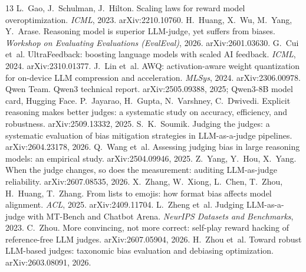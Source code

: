 \documentclass[10pt]{article}
\begin{document}
\begin{thebibliography}{13}\small
{} L.~Gao, J.~Schulman, J.~Hilton. Scaling laws for reward model
overoptimization. \emph{ICML}, 2023. arXiv:2210.10760.
 H.~Huang, X.~Wu, M.~Yang, Y.~Arase. Reasoning model is superior
LLM-judge, yet suffers from biases. \emph{Workshop on Evaluating Evaluations (EvalEval)}, 2026.
arXiv:2601.03630.
 G.~Cui et~al. UltraFeedback: boosting language models with
scaled AI feedback. \emph{ICML}, 2024. arXiv:2310.01377.
 J.~Lin et~al. AWQ: activation-aware weight quantization for on-device LLM
compression and acceleration. \emph{MLSys}, 2024. arXiv:2306.00978.
 Qwen Team. Qwen3 technical report. arXiv:2505.09388, 2025; Qwen3-8B
model card, Hugging Face.
 P.~Jayarao, H.~Gupta, N.~Varshney, C.~Dwivedi. Explicit
reasoning makes better judges: a systematic study on accuracy, efficiency, and robustness. arXiv:2509.13332, 2025.
 S.~K.~Soumik. Judging the judges: a systematic evaluation of bias
mitigation strategies in LLM-as-a-judge pipelines. arXiv:2604.23178, 2026.
 Q.~Wang et~al. Assessing judging bias in large reasoning models:
an empirical study. arXiv:2504.09946, 2025.
 Z.~Yang, Y.~Hou, X.~Yang. When the judge changes, so does the
measurement: auditing LLM-as-judge reliability. arXiv:2607.08535, 2026.
 X.~Zhang, W.~Xiong, L.~Chen, T.~Zhou, H.~Huang, T.~Zhang. From lists
to emojis: how format bias affects model alignment. \emph{ACL}, 2025. arXiv:2409.11704.
 L.~Zheng et~al. Judging LLM-as-a-judge with MT-Bench and Chatbot
Arena. \emph{NeurIPS Datasets and Benchmarks}, 2023.
 C.~Zhou. More convincing, not more correct: self-play reward hacking of
reference-free LLM judges. arXiv:2607.05904, 2026.
 H.~Zhou et~al. Toward robust LLM-based judges: taxonomic bias
evaluation and debiasing optimization. arXiv:2603.08091, 2026.
\end{thebibliography}

\appendix
\end{document}
